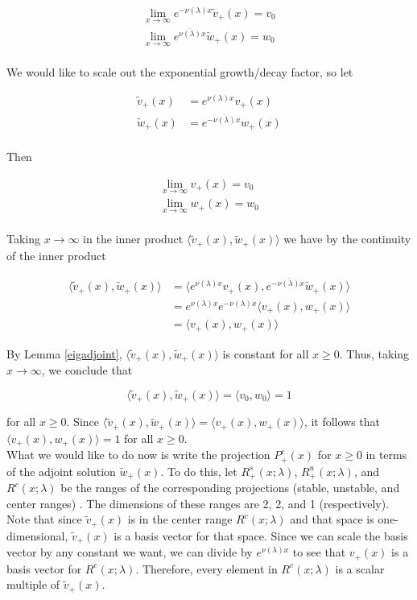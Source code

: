 \documentclass[12pt]{article}
\begin{document}
\begin{align*}
\lim_{x \rightarrow \infty} e^{-\nu(\lambda) x} \tilde{v}_+(x) = v_0 \\
\lim_{x \rightarrow \infty} e^{\overline{\nu(\lambda)} x} \tilde{w}_+(x) = w_0 \\
\end{align*}

We would like to scale out the exponential growth/decay factor, so let

\begin{align*}
\tilde{v}_+(x) &= e^{\nu(\lambda) x } v_+(x) \\
\tilde{w}_+(x) &= e^{-\overline{\nu(\lambda)} x } w_+(x) \\
\end{align*}

Then

\begin{align*}
\lim_{x \rightarrow \infty} v_+(x) = v_0 \\
\lim_{x \rightarrow \infty} w_+(x) = w_0 \\
\end{align*}

Taking $x \rightarrow \infty$ in the inner product $\langle \tilde{v}_+(x), \tilde{w}_+(x) \rangle$ we have by the continuity of the inner product

\begin{align*}
\langle \tilde{v}_+(x), \tilde{w}_+(x) \rangle
&= \langle e^{\nu(\lambda) x } v_+(x), e^{-\overline{\nu(\lambda)} x} \tilde{w}_+(x) \rangle \\
&= e^{\nu(\lambda) x } e^{-\nu(\lambda) x } \langle v_+(x), w_+(x) \rangle \\
&= \langle v_+(x), w_+(x) \rangle
\end{align*}

By Lemma \ref{eigadjoint}, $\langle \tilde{v}_+(x), \tilde{w}_+(x) \rangle$ is constant for all $x \geq 0$. Thus, taking $x \rightarrow \infty$, we conclude that 


\[
\langle \tilde{v}_+(x), \tilde{w}_+(x) \rangle = \langle v_0, w_0 \rangle = 1
\]

for all $x \geq 0$. Since $\langle \tilde{v}_+(x), \tilde{w}_+(x) \rangle = \langle v_+(x), w_+(x) \rangle$, it follows that $\langle v_+(x), w_+(x) \rangle = 1$ for all $x \geq 0$.\\

What we would like to do now is write the projection $P^c_+(x)$ for $x \geq 0$ in terms of the adjoint solution $\tilde{w}_+(x)$. To do this, let $R^s_+(x; \lambda)$, $R^u_+(x; \lambda)$, and $R^c(x; \lambda)$ be the ranges of the corresponding projections (stable, unstable, and center ranges)
. The dimensions of these ranges are 2, 2, and 1 (respectively). Note that since $\tilde{v}_+(x)$ is in the center range $R^c(x; \lambda)$ and that space is one-dimensional, $\tilde{v}_+(x)$ is a basis vector for that space. Since we can scale the basis vector by any constant we want, we can divide by $e^{\nu(\lambda) x }$ to see that $v_+(x)$ is a basis vector for $R^c(x; \lambda)$. Therefore, every element in $R^c(x; \lambda)$ is a scalar multiple of $\tilde{v}_+(x)$. \\
\end{document}
